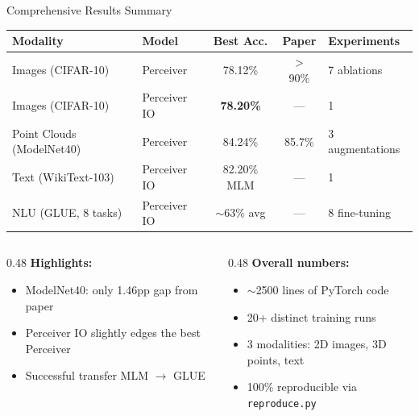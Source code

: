 \documentclass[aspectratio=169,11pt]{beamer}
\begin{document}
\begin{frame}[shrink=5]{Comprehensive Results Summary}
  \begin{table}
    \centering\small
    \begin{tabular}{llccl}
      \toprule
      \textbf{Modality} & \textbf{Model} & \textbf{Best Acc.} & \textbf{Paper} & \textbf{Experiments} \\
      \midrule
      Images (CIFAR-10) & Perceiver & 78.12\% & $>$90\% & 7 ablations \\
      Images (CIFAR-10) & Perceiver IO & \textbf{78.20\%} & --- & 1 \\
      Point Clouds (ModelNet40) & Perceiver & 84.24\% & 85.7\% & 3 augmentations \\
      Text (WikiText-103) & Perceiver IO & 82.20\% MLM & --- & 1 \\
      NLU (GLUE, 8 tasks) & Perceiver IO & $\sim$63\% avg & --- & 8 fine-tuning \\
      \bottomrule
    \end{tabular}
  \end{table}

  \vspace{0.5em}
  \begin{columns}[T]
    \begin{column}{0.48\textwidth}
      \textbf{Highlights:}
      \begin{itemize}
        \item ModelNet40: only 1.46pp gap from paper
        \item Perceiver IO slightly edges the best Perceiver
        \item Successful transfer MLM $\rightarrow$ GLUE
      \end{itemize}
    \end{column}
    \begin{column}{0.48\textwidth}
      \textbf{Overall numbers:}
      \begin{itemize}
        \item $\sim$2500 lines of PyTorch code
        \item 20+ distinct training runs
        \item 3 modalities: 2D images, 3D points, text
        \item 100\% reproducible via \texttt{reproduce.py}
      \end{itemize}
    \end{column}
  \end{columns}
\end{frame}
\end{document}
